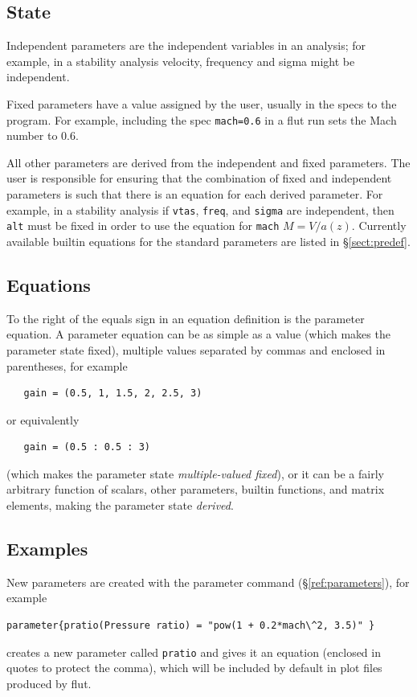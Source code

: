 \documentclass[11pt,openany,twoside]{book}
\numberwithin{equation}{section}		%
\newcommand{\Cmd}[1]{{\sf #1}}
\newcommand{\Newterm}[1]{{\em #1}}
\newcommand{\Code}[1]{{\small\tt #1}}
\newcommand{\Sectref}[1]{\S\ref{#1}}
\begin{document}
\subsection{State}\label{sect:parstate}
Independent parameters are the independent variables
in an analysis; for example, in a stability analysis velocity, frequency and
sigma might be independent.
\par
Fixed parameters
have a value assigned
by the user, usually in the specs to the program. For example,
including the spec \Code{mach=0.6} in a \Cmd{flut}
run sets the Mach number to 0.6.
\par
All other parameters are derived
from the independent and fixed parameters. The user is responsible for
ensuring that the combination of fixed and independent parameters is
such that there is an equation for each derived parameter.
For example, in a stability analysis if \Code{vtas},
\Code{freq}, and \Code{sigma} are independent, then
\Code{alt} must be fixed in order to use the equation
for \Code{mach} $M = V/a(z)$.
Currently available builtin equations for the standard parameters
are listed in \Sectref{sect:predef}.

\subsection{Equations}\label{sect:pareqns}
To the right of the equals sign in an equation definition is
the parameter equation.
A parameter equation can be as simple as a value (which makes
the parameter state fixed),
multiple values separated
by commas and enclosed in parentheses, for example
\begin{lstlisting}
   gain = (0.5, 1, 1.5, 2, 2.5, 3)
\end{lstlisting}
or equivalently
\begin{lstlisting}
   gain = (0.5 : 0.5 : 3)
\end{lstlisting}

(which makes the parameter state \Newterm{multiple-valued fixed}),
or it can be a fairly arbitrary function of scalars, other parameters,
builtin functions, and matrix elements,
making the parameter state \Newterm{derived}.
\par

\subsection{Examples} \label{sect:par-examples}
New parameters are created with the
\Cmd{parameter} command (\Sectref{ref:parameters}),
for example
\begin{lstlisting}
parameter{pratio(Pressure ratio) = "pow(1 + 0.2*mach\^2, 3.5)" }
\end{lstlisting}
creates a new parameter called \Code{pratio} and gives it an equation
(enclosed in quotes to protect the comma), which will be included by
default in plot files produced by \Cmd{flut}.
\end{document}
